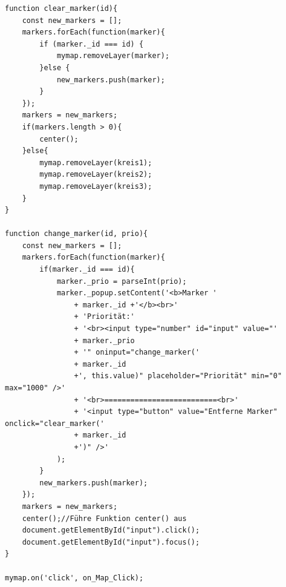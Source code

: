 \documentclass[a4paper, 12pt]{scrreprt}
\begin{document}
\begin{lstlisting}
function clear_marker(id){
	const new_markers = [];
	markers.forEach(function(marker){
		if (marker._id === id) {
			mymap.removeLayer(marker);
		}else {
			new_markers.push(marker);
		}
	});
	markers = new_markers;
	if(markers.length > 0){
		center();
	}else{
		mymap.removeLayer(kreis1);
		mymap.removeLayer(kreis2);
		mymap.removeLayer(kreis3);
	}
}

function change_marker(id, prio){
	const new_markers = [];
	markers.forEach(function(marker){
		if(marker._id === id){
			marker._prio = parseInt(prio);
			marker._popup.setContent('<b>Marker '
				+ marker._id +'</b><br>'
				+ 'Priorität:'
				+ '<br><input type="number" id="input" value="'
				+ marker._prio
				+ '" oninput="change_marker('
				+ marker._id
				+', this.value)" placeholder="Priorität" min="0" max="1000" />'
				+ '<br>==========================<br>'
				+ '<input type="button" value="Entferne Marker" onclick="clear_marker('
				+ marker._id
				+')" />'
			);
		}
		new_markers.push(marker);
	});
	markers = new_markers;
	center();//Führe Funktion center() aus
	document.getElementById("input").click();
	document.getElementById("input").focus();
}

mymap.on('click', on_Map_Click);
\end{lstlisting}
\end{document}
